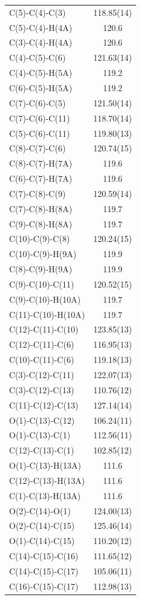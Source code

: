 \begin{center}
{\begin{supertabular}{p{1.5in}c}
C(5)-C(4)-C(3)&118.85(14)\\
C(5)-C(4)-H(4A)&120.6\\
C(3)-C(4)-H(4A)&120.6\\
C(4)-C(5)-C(6)&121.63(14)\\
C(4)-C(5)-H(5A)&119.2\\
C(6)-C(5)-H(5A)&119.2\\
C(7)-C(6)-C(5)&121.50(14)\\
C(7)-C(6)-C(11)&118.70(14)\\
C(5)-C(6)-C(11)&119.80(13)\\
C(8)-C(7)-C(6)&120.74(15)\\
C(8)-C(7)-H(7A)&119.6\\
C(6)-C(7)-H(7A)&119.6\\
C(7)-C(8)-C(9)&120.59(14)\\
C(7)-C(8)-H(8A)&119.7\\
C(9)-C(8)-H(8A)&119.7\\
C(10)-C(9)-C(8)&120.24(15)\\
C(10)-C(9)-H(9A)&119.9\\
C(8)-C(9)-H(9A)&119.9\\
C(9)-C(10)-C(11)&120.52(15)\\
C(9)-C(10)-H(10A)&119.7\\
C(11)-C(10)-H(10A)&119.7\\
C(12)-C(11)-C(10)&123.85(13)\\
C(12)-C(11)-C(6)&116.95(13)\\
C(10)-C(11)-C(6)&119.18(13)\\
C(3)-C(12)-C(11)&122.07(13)\\
C(3)-C(12)-C(13)&110.76(12)\\
C(11)-C(12)-C(13)&127.14(14)\\
O(1)-C(13)-C(12)&106.24(11)\\
O(1)-C(13)-C(1)&112.56(11)\\
C(12)-C(13)-C(1)&102.85(12)\\
O(1)-C(13)-H(13A)&111.6\\
C(12)-C(13)-H(13A)&111.6\\
C(1)-C(13)-H(13A)&111.6\\
O(2)-C(14)-O(1)&124.00(13)\\
O(2)-C(14)-C(15)&125.46(14)\\
O(1)-C(14)-C(15)&110.20(12)\\
C(14)-C(15)-C(16)&111.65(12)\\
C(14)-C(15)-C(17)&105.06(11)\\
C(16)-C(15)-C(17)&112.98(13)\\

\end{supertabular}}
\end{center}
